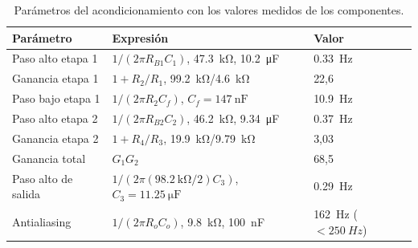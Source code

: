 \documentclass[11pt,a4paper]{article}
\begin{document}
\begin{table}[H]
\centering\small
\caption{Parámetros del acondicionamiento con los valores medidos de los componentes.}
\label{tab:m2}
\begin{tabular}{lll}
\toprule
Parámetro & Expresión & Valor \\
\midrule
Paso alto etapa 1 & $1/(2\pi R_{B1} C_1)$, \qty{47.3}{\kilo\ohm}, \qty{10.2}{\micro\farad} & \qty{0.33}{Hz} \\
Ganancia etapa 1 & $1 + R_2/R_1$, \qty{99.2}{\kilo\ohm}/\qty{4.6}{\kilo\ohm} & 22,6 \\
Paso bajo etapa 1 & $1/(2\pi R_2 C_f)$, $C_f = \qty{147}{\nano\farad}$ & \qty{10.9}{Hz} \\
Paso alto etapa 2 & $1/(2\pi R_{B2} C_2)$, \qty{46.2}{\kilo\ohm}, \qty{9.34}{\micro\farad} & \qty{0.37}{Hz} \\
Ganancia etapa 2 & $1 + R_4/R_3$, \qty{19.9}{\kilo\ohm}/\qty{9.79}{\kilo\ohm} & 3,03 \\
Ganancia total & $G_1 G_2$ & 68,5 \\
Paso alto de salida & $1/(2\pi (\qty{98.2}{\kilo\ohm}/2) C_3)$, $C_3 = \qty{11.25}{\micro\farad}$ & \qty{0.29}{Hz} \\
Antialiasing & $1/(2\pi R_o C_o)$, \qty{9.8}{\kilo\ohm}, \qty{100}{\nano\farad} & \qty{162}{Hz} ($< \qty{250}{Hz}$) \\
\bottomrule
\end{tabular}
\end{table}
\end{document}
